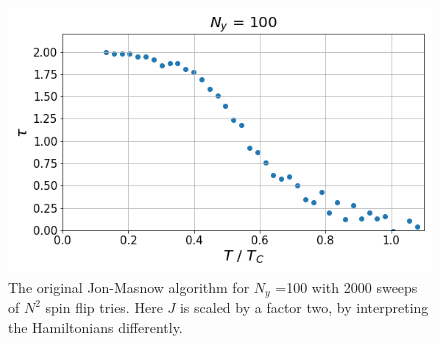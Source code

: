 \documentclass[11pt,a4paper,twocolumn]{article}
\begin{document}
\begin{figure}
	\centering
	\includegraphics[width=\linewidth]{img/Ny100_Sweeps2000_Nruns1_Skips3}
	\caption{The original Jon-Masnow algorithm for $N_y$ =100 with 2000 sweeps of $N^2$ spin flip tries. Here $J$ is scaled by a factor two, by interpreting the Hamiltonians differently.}
	\label{fig:ny100sweeps2000nruns1skips3}
\end{figure}



\end{document}
